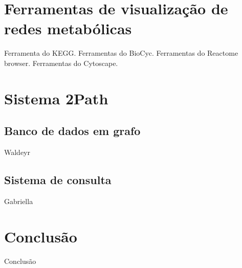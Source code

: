 \documentclass[conference]{IEEEtran}
\begin{document}
\section{Ferramentas de visualização de redes metabólicas}

Ferramenta do KEGG. Ferramentas do BioCyc. Ferramentas do Reactome browser.
Ferramentas do Cytoscape.

\section{Sistema 2Path}

\subsection{Banco de dados em grafo}

Waldeyr

\subsection{Sistema de consulta}

Gabriella

\section{Conclusão}

Conclusão





%
%
\end{document}
